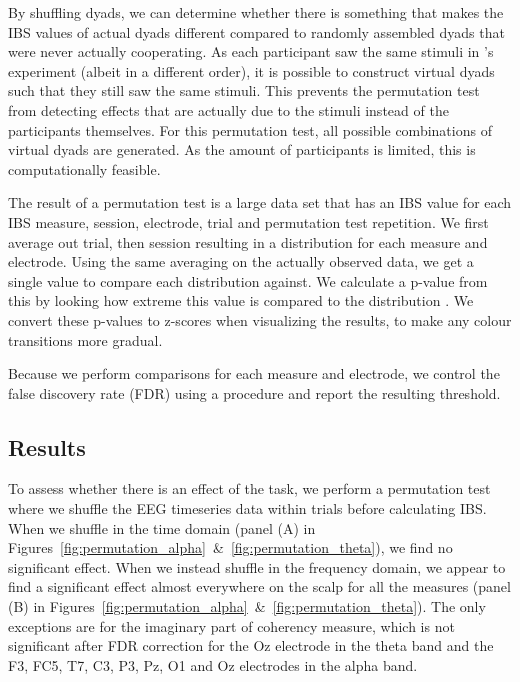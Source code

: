 By shuffling dyads, we can determine whether there is something that makes the
IBS values of actual dyads different compared to randomly assembled dyads that
were never actually cooperating. As each participant saw the same stimuli in
\textcite{newman_effects_2021}'s experiment (albeit in a different order), it is
possible to construct virtual dyads such that they still saw the same stimuli.
This prevents the permutation test from detecting effects that are actually due
to the stimuli instead of the participants themselves. For this permutation
test, all possible combinations of virtual dyads are generated. As the amount of
participants is limited, this is computationally feasible.

The result of a permutation test is a large data set that has an IBS value for
each IBS measure, session, electrode, trial and permutation test repetition. We
first average out trial, then session resulting in a distribution for each
measure and electrode. Using the same averaging on the actually observed data,
we get a single value to compare each distribution against. We calculate a
p-value from this by looking how extreme this value is compared to the
distribution \parencite[see][for a robust method]{phipson_permutation_2010}.
We convert these p-values to z-scores when visualizing the results, to make any
colour transitions more gradual.

Because we perform comparisons for each measure and electrode, we control the
false discovery rate (FDR) using a \textcite{benjamini_controlling_1995}
procedure and report the resulting threshold.

\subsection{Results}

To assess whether there is an effect of the task, we perform a permutation test
where we shuffle the EEG timeseries data within trials before calculating IBS.
When we shuffle in the time domain (panel (A) in
Figures~\ref{fig:permutation_alpha}~\&~\ref{fig:permutation_theta}), we find no
significant effect. When we instead shuffle in the frequency domain, we appear
to find a significant effect almost everywhere on the scalp for all the measures
(panel (B) in Figures~\ref{fig:permutation_alpha}~\&~\ref{fig:permutation_theta}).
The only exceptions are for the imaginary part of coherency measure, which is
not significant after FDR correction for the Oz electrode in the theta band and
the F3, FC5, T7, C3, P3, Pz, O1 and Oz electrodes in the alpha band.

